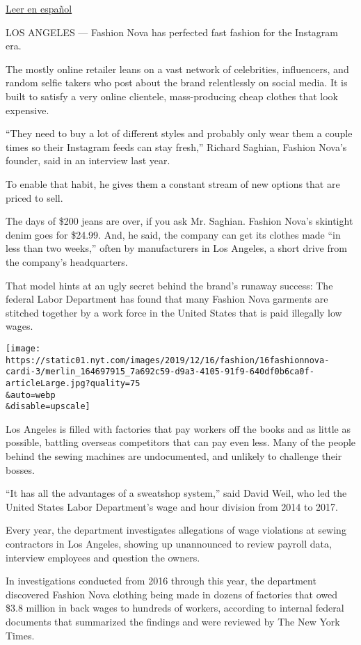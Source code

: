 \href{https://www.nytimes.com/es/2019/12/17/espanol/negocios/nova-trabajadores.html}{Leer
en español}

LOS ANGELES --- Fashion Nova has perfected fast fashion for the
Instagram era.

The mostly online retailer leans on a vast network of celebrities,
influencers, and random selfie takers who post about the brand
relentlessly on social media. It is built to satisfy a very online
clientele, mass-producing cheap clothes that look expensive.

``They need to buy a lot of different styles and probably only wear them
a couple times so their Instagram feeds can stay fresh,'' Richard
Saghian, Fashion Nova's founder, said in an interview last year.

To enable that habit, he gives them a constant stream of new options
that are priced to sell.

The days of \$200 jeans are over, if you ask Mr. Saghian. Fashion Nova's
skintight denim goes for \$24.99. And, he said, the company can get its
clothes made ``in less than two weeks,'' often by manufacturers in Los
Angeles, a short drive from the company's headquarters.

That model hints at an ugly secret behind the brand's runaway success:
The federal Labor Department has found that many Fashion Nova garments
are stitched together by a work force in the United States that is paid
illegally low wages.

\texttt{[image: https://static01.nyt.com/images/2019/12/16/fashion/16fashionnova-cardi-3/merlin\_164697915\_7a692c59-d9a3-4105-91f9-640df0b6ca0f-articleLarge.jpg?quality=75\\\&auto=webp\\\&disable=upscale]}

Los Angeles is filled with factories that pay workers off the books and
as little as possible, battling overseas competitors that can pay even
less. Many of the people behind the sewing machines are undocumented,
and unlikely to challenge their bosses.

``It has all the advantages of a sweatshop system,'' said David Weil,
who led the United States Labor Department's wage and hour division from
2014 to 2017.

Every year, the department investigates allegations of wage violations
at sewing contractors in Los Angeles, showing up unannounced to review
payroll data, interview employees and question the owners.

In investigations conducted from 2016 through this year, the department
discovered Fashion Nova clothing being made in dozens of factories that
owed \$3.8 million in back wages to hundreds of workers, according to
internal federal documents that summarized the findings and were
reviewed by The New York Times.

